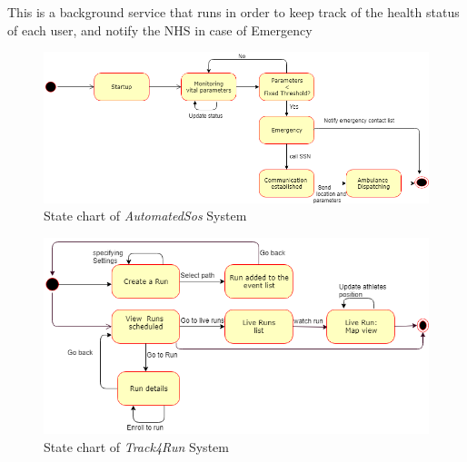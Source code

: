 This is a background service that runs in order to keep track of the health status of each user, and notify the NHS in case of Emergency 
\begin{figure}[H]
    \centering
    \includegraphics[scale=0.4]{Pictures/state chart 2.png}
    \caption{State chart of \emph{AutomatedSos} System}
\end{figure}
\begin{figure}[H]
    \centering
    \includegraphics[scale=0.4]{Pictures/statechart3.png}
    \caption{State chart  of \emph{Track4Run} System}
\end{figure}